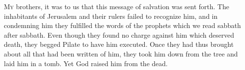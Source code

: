 \lettrine[lines=3,loversize=0.15]{M}{y} brothers, it was to us that this message of salvation was sent forth. The inhabitants of Jerusalem and their rulers failed to recognize him, and in condemning him they fulfilled the words of the prophets which we read sabbath after sabbath. Even though they found no charge against him which deserved death, they begged Pilate to have him executed. Once they had thus brought about all that had been written of him, they took him down from the tree and laid him in a tomb. Yet God raised him from the dead.

